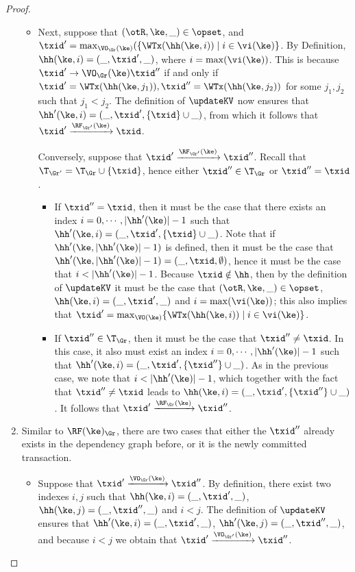 \begin{proof}
\begin{enumerate}
\begin{itemize}
\item Next, suppose that $(\otR, \ke, \_) \in \opset$, and $\txid' = \max_{\VO_{\Gr}(\ke)}(\{\WTx(\hh(\ke, i)) \mid i \in \vi(\ke)\}$. 
By Definition, $\hh(\ke, i) = (\_, \txid', \_)$, where $i = \max(\vi(\ke))$. This is because 
$\txid' \rightarrow{\VO_{\Gr}(\ke)} \txid''$ if and only if $\txid' = \WTx(\hh(\ke, j_1)), \txid'' = 
\WTx(\hh(\ke, j_2))$ for some $j_1, j_2$ such that $j_1 < j_2$. 
The definition of $\updateKV$ now ensures that $\hh'(\ke, i) = (\_, \txid', \{\txid \} \cup \_)$, 
from which it follows that $\txid' \xrightarrow{\RF_{\Gr'}(\ke)} \txid$.

Conversely, suppose that $\txid' \xrightarrow{\RF_{\Gr'}(\ke)} \txid''$. 
Recall that $\T_{\Gr'} = \T_{\Gr} \cup \{ \txid \}$, hence either 
$\txid'' \in \T_{\Gr}$ or $\txid'' = \txid$. 

\begin{itemize}
\item If $\txid'' = \txid$, then it must be the case that there exists an index $i = 0,\cdots, \lvert \hh'(\ke) \rvert - 1$ 
such that $\hh'(\ke, i) = (\_, \txid', \{\txid \} \cup \_)$. Note that if $\hh'(\ke, \lvert \hh'(\ke) \rvert -1)$ is 
defined, then it must be the case that $\hh'(\ke, \lvert \hh'(\ke) \rvert -1) = (\_, \txid, \emptyset)$, 
hence it must be the case that $i < \lvert \hh'(\ke) \rvert - 1$. Because $\txid \notin \hh$, 
then by the definition of $\updateKV$ it must be the case that $(\otR, \ke, \_) \in \opset$, 
$\hh(\ke, i) = (\_, \txid', \_)$ and $i = \max(\vi(\ke))$; this also implies that $\txid' = 
\max_{\VO(\ke)}\{\WTx(\hh(\ke, i)) \mid i \in \vi(\ke)\}$. 

\item If $\txid'' \in \T_{\Gr}$, then  it must be the case that $\txid'' \neq \txid$. 
In this case, it also must exist an index $i = 0,\cdots, \lvert \hh'(\ke) \rvert - 1$ 
such that $\hh'(\ke, i) = (\_, \txid', \{\txid''\} \cup \_)$. As in the previous 
case, we note that $i < \lvert \hh'(\ke) \rvert - 1$, which together 
with the fact that $\txid'' \neq \txid$ leads to $\hh(\ke, i) = (\_, \txid', \{\txid''\} \cup \_)$. 
It follows that $\txid' \xrightarrow{\RF_{\Gr}(\ke)} \txid''$.
\end{itemize}
\end{itemize}

\item 
Similar to \( \RF(\ke)_{\Gr} \), there are two cases that either the \( \txid'' \) already exists in the dependency graph before,
or it is the newly committed transaction.
\begin{itemize}
\item Suppose that $\txid' \xrightarrow{\VO_{\Gr}(\ke)} \txid''$. 
By definition, there exist two indexes $i, j$ such that 
$\hh(\ke, i) = (\_, \txid', \_)$, $\hh(\ke, j) = (\_, \txid'', \_)$ 
and $i < j$. The definition of $\updateKV$ ensures that 
$\hh'(\ke, i) = (\_, \txid', \_)$, $\hh'(\ke, j) = (\_, \txid'', \_)$, 
and because $i < j$ we obtain that $\txid' \xrightarrow{\VO_{\Gr'}(\ke)} \txid''$. 


\end{itemize}
\end{enumerate}
\end{proof}

